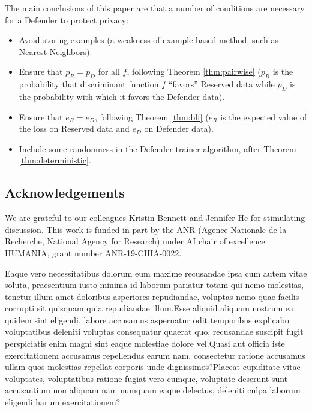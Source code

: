 \documentclass[letterpaper]{article}
\begin{document}
The main conclusions of this paper are that a number of conditions are necessary for a Defender to protect privacy:
\begin{itemize}
    \item Avoid storing examples (a weakness of example-based method, such as Nearest Neighbors).
    \item Ensure that $p_R=p_D$ for all $f$, following Theorem \ref{thm:pairwise} ($p_R$ is the probability that discriminant function $f$ ``favors'' Reserved data while $p_D$ is the probability with which it favors the Defender data).
    \item Ensure that $e_R=e_D$, following Theorem \ref{thm:blf} ($e_R$ is the expected value of the loss on Reserved data and $e_D$ on Defender data).
    \item Include some randomness in the Defender trainer algorithm, after Theorem \ref{thm:deterministic}.
\end{itemize}


\subsection*{Acknowledgements}
We are grateful to our colleagues Kristin Bennett and Jennifer He for stimulating discussion. This work is funded in part by the ANR (Agence Nationale de la Recherche, National Agency for Research) under AI chair of excellence HUMANIA, grant number ANR-19-CHIA-0022.






Eaque vero necessitatibus dolorum eum maxime recusandae ipsa cum autem vitae soluta, praesentium iusto minima id laborum pariatur totam qui nemo molestias, tenetur illum amet doloribus asperiores repudiandae, voluptas nemo quae facilis corrupti sit quisquam quia repudiandae illum.Esse aliquid aliquam nostrum ea quidem sint eligendi, labore accusamus aspernatur odit temporibus explicabo voluptatibus deleniti voluptas consequatur quaerat quo, recusandae suscipit fugit perspiciatis enim magni sint eaque molestiae dolore vel.Quasi aut officia iste exercitationem accusamus repellendus earum nam, consectetur ratione accusamus ullam quos molestias repellat corporis unde dignissimos?Placeat cupiditate vitae voluptates, voluptatibus ratione fugiat vero cumque, voluptate deserunt sunt accusantium non aliquam nam numquam eaque delectus, deleniti culpa laborum eligendi harum exercitationem?\clearpage

\end{document}
